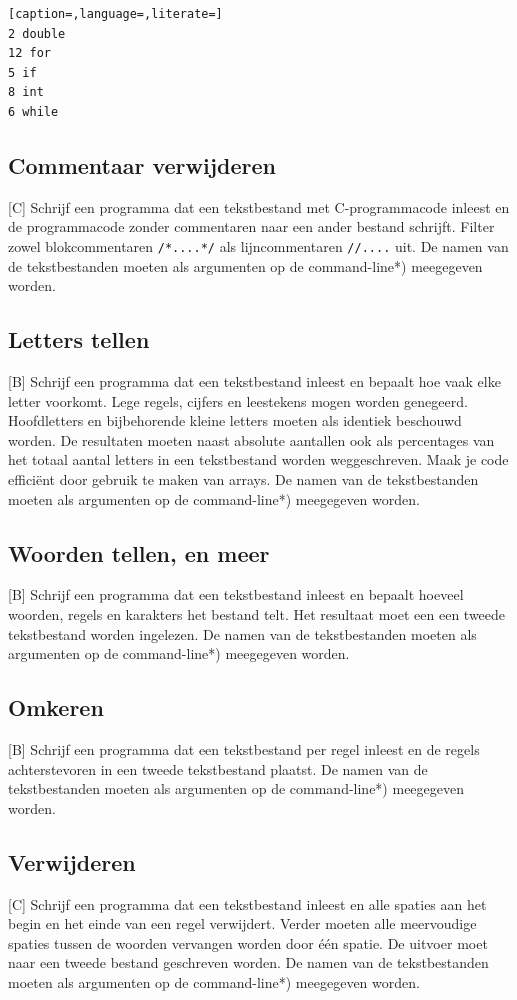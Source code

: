\documentclass[a4paper,10pt,fleqn,twoside]{article}
\begin{document}
\begin{lstlisting}[caption=,language=,literate=]
2 double
12 for
5 if
8 int
6 while
\end{lstlisting}

\subsection{Commentaar verwijderen}[C]
Schrijf een programma dat een tekstbestand met C-programmacode inleest en de programmacode zonder commentaren naar een ander bestand schrijft. Filter zowel blokcommentaren \lstinline|/*....*/| als lijncommentaren \lstinline|//....| uit. De namen van de tekstbestanden moeten als argumenten op de command-line*) meegegeven worden. 

\subsection{Letters tellen}[B]
Schrijf een programma dat een tekstbestand inleest en bepaalt hoe vaak elke letter voorkomt. Lege regels, cijfers en leestekens mogen worden genegeerd. Hoofdletters en bijbehorende kleine letters moeten als identiek beschouwd worden. De resultaten moeten naast absolute aantallen ook als percentages van het totaal aantal letters in een tekstbestand worden weggeschreven. Maak je code efficiënt door gebruik te maken van arrays. De namen van de tekstbestanden moeten als argumenten op de command-line*) meegegeven worden.

\subsection{Woorden tellen, en meer}[B]
Schrijf een programma dat een tekstbestand inleest en bepaalt hoeveel woorden, regels en karakters het bestand telt. Het resultaat moet een een tweede tekstbestand worden ingelezen. De namen van de tekstbestanden moeten als argumenten op de command-line*) meegegeven worden.

\subsection{Omkeren}[B]
Schrijf een programma dat een tekstbestand per regel inleest en de regels achterstevoren in een tweede tekstbestand plaatst. De namen van de tekstbestanden moeten als argumenten op de command-line*) meegegeven worden.

\subsection{Verwijderen}[C]
Schrijf een programma dat een tekstbestand inleest en alle spaties aan het begin en het einde van een regel verwijdert. Verder moeten alle meervoudige spaties tussen de woorden vervangen worden door \'e\'en spatie. De uitvoer moet naar een tweede bestand geschreven worden.
De namen van de tekstbestanden moeten als argumenten op de command-line*) meegegeven worden.
\end{document}
